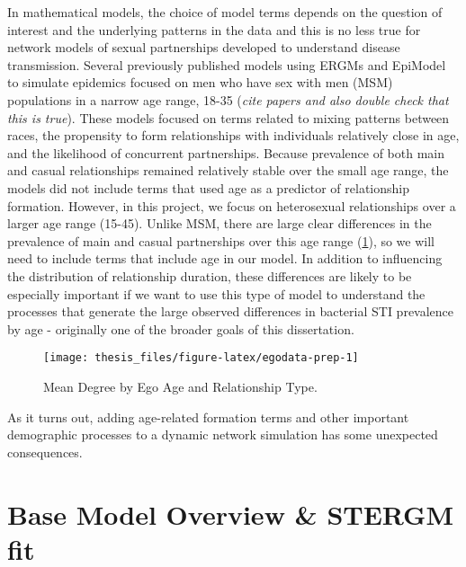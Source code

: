 \documentclass [11pt, proquest] {uwthesis}[2015/03/03]
\begin{document}
In mathematical models, the choice of model terms depends on the
question of interest and the underlying patterns in the data and this is
no less true for network models of sexual partnerships developed to
understand disease transmission. Several previously published models
using ERGMs and EpiModel to simulate epidemics focused on men who have
sex with men (MSM) populations in a narrow age range, 18-35 (\emph{cite
papers and also double check that this is true}). These models focused
on terms related to mixing patterns between races, the propensity to
form relationships with individuals relatively close in age, and the
likelihood of concurrent partnerships. Because prevalence of both main
and casual relationships remained relatively stable over the small age
range, the models did not include terms that used age as a predictor of
relationship formation. However, in this project, we focus on
heterosexual relationships over a larger age range (15-45). Unlike MSM,
there are large clear differences in the prevalence of main and casual
partnerships over this age range (\ref{fig:egodata-prep}), so we will
need to include terms that include age in our model. In addition to
influencing the distribution of relationship duration, these differences
are likely to be especially important if we want to use this type of
model to understand the processes that generate the large observed
differences in bacterial STI prevalence by age - originally one of the
broader goals of this dissertation.
\begin{figure}

{\centering \texttt{[image: thesis\_files/figure-latex/egodata-prep-1]} 

}

\caption{Mean Degree by Ego Age and Relationship Type.}\label{fig:egodata-prep}
\end{figure}
As it turns out, adding age-related formation terms and other important
demographic processes to a dynamic network simulation has some
unexpected consequences.

\section{Base Model Overview \& STERGM
fit}\label{base-model-overview-stergm-fit}
\end{document}
